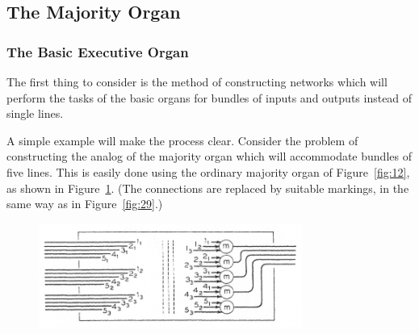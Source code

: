 \documentclass[twocolumn,preprintnumbers,amsmath,amssymb,floatfix]{revtex4}
\begin{document}
\subsection{\label{sec:nine2}The Majority Organ}

\subsubsection{\label{sec:nine2_1}The Basic Executive Organ} The
first thing to consider is the method of constructing networks
which will perform the tasks of the basic organs for bundles of
inputs and outputs instead of single lines.

A simple example will make the process clear. Consider the problem
of constructing the analog of the majority organ which will
accommodate bundles of five lines. This is easily done using the
ordinary majority organ of Figure~\ref{fig:12}, as shown in
Figure~\ref{fig:30}. (The connections are replaced by suitable
markings, in the same way as in Figure~\ref{fig:29}.)

\begin{figure}
\includegraphics[width=3.4in]{fig_30}
\caption{\label{fig:30}}
\end{figure}
\end{document}
